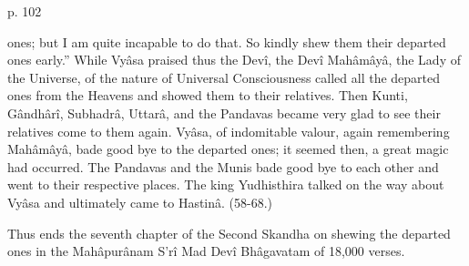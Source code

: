  

p. 102

 

ones; but I am quite incapable to do that. So kindly shew them their departed ones early.” While Vyâsa praised thus the Devî, the Devî Mahâmâyâ, the Lady of the Universe, of the nature of Universal Consciousness called all the departed ones from the Heavens and showed them to their relatives. Then Kunti, Gândhârî, Subhadrâ, Uttarâ, and the Pandavas became very glad to see their relatives come to them again. Vyâsa, of indomitable valour, again remembering Mahâmâyâ, bade good bye to the departed ones; it seemed then, a great magic had occurred. The Pandavas and the Munis bade good bye to each other and went to their respective places. The king Yudhisthira talked on the way about Vyâsa and ultimately came to Hastinâ. (58-68.)

 

Thus ends the seventh chapter of the Second Skandha on shewing the departed ones in the Mahâpurânam S’rî Mad Devî Bhâgavatam of 18,000 verses.
